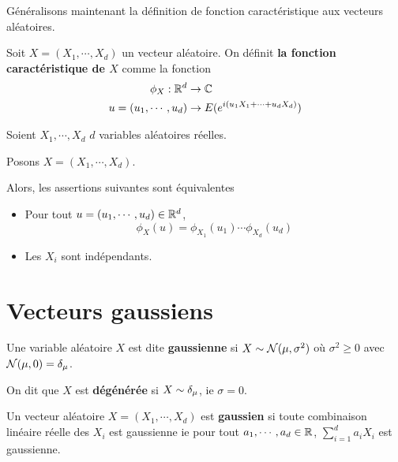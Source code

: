 Généralisons maintenant la définition de fonction caractéristique aux vecteurs
aléatoires.

\begin{definition}
	Soit $X = (X_{1}, \cdots, X_{d})$ un vecteur aléatoire.
	On définit \textbf{la fonction caractéristique de $X$} comme la fonction
	\begin{align}
		\phi_{X} : \mathbb{R}^{d} &\rightarrow \mathbb{C} \\
		u = (u_{1}, \cdots, u_{d}) &\rightarrow E(e^{i(u_{1} X_{1} + \cdots +
		u_{d} X_{d})})
		\label{equation:definition_fonction_caractéristique_vecteur}
	\end{align}
\end{definition}

\begin{theorem}
	Soient $X_{1}, \cdots, X_{d}$ $d$ variables aléatoires réelles.

	Posons $X = (X_{1}, \cdots, X_{d})$.

	Alors, les assertions suivantes sont équivalentes
	\begin{itemize}
		\item Pour tout $u = (u_{1}, \cdots, u_{d}) \in \mathbb{R}^{d}$,
				\begin{equation}
					\phi_{X}(u) = \phi_{X_{1}}(u_{1}) \cdots \phi_{X_{d}}(u_{d})
				\end{equation}
		\item Les $X_{i}$ sont indépendants.
	\end{itemize}
\end{theorem}

\section{Vecteurs gaussiens}

\begin{definition}
	Une variable aléatoire $X$ est dite \textbf{gaussienne} si $X \sim
	\mathcal{N}(\mu, \sigma^{2})$ où $\sigma^{2} \geq 0$ avec
	$\mathcal{N}(\mu, 0) = \delta_{\mu}$.

	On dit que $X$ est \textbf{dégénérée} si $X \sim \delta_{\mu}$, ie
	$\sigma = 0$.
\end{definition}

\begin{definition}
	Un vecteur aléatoire $X = (X_{1}, \cdots, X_{d})$ est \textbf{gaussien} si
	toute combinaison linéaire réelle des $X_{i}$ est gaussienne ie pour tout
	$a_{1}, \cdots, a_{d} \in \mathbb{R}$, $\displaystyle \sum_{i = 1}^{d}
	a_{i}X_{i}$ est gaussienne.
\end{definition}

